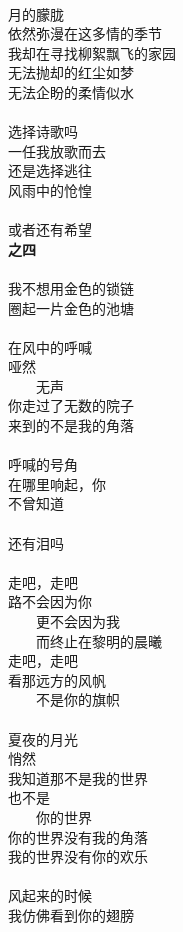 \\
月的朦胧\\
依然弥漫在这多情的季节\\
我却在寻找柳絮飘飞的家园\\
无法抛却的红尘如梦\\
无法企盼的柔情似水\\
\\
选择诗歌吗\\
一任我放歌而去\\
还是选择逃往\\
风雨中的怆惶\\
\\
或者还有希望\\
\newpage\noindent
\textbf{之四}\\
\\
我不想用金色的锁链\\
圈起一片金色的池塘\\
\\
在风中的呼喊\\
哑然\\
　　无声\\
你走过了无数的院子\\
来到的不是我的角落\\
\\
呼喊的号角\\
在哪里响起，你\\
不曾知道\\
\\
还有泪吗\\
\\
走吧，走吧\\
路不会因为你\\
　　更不会因为我\\
　　而终止在黎明的晨曦\\
走吧，走吧\\
看那远方的风帆\\
　　不是你的旗帜\\
\\
夏夜的月光\\
悄然\\
我知道那不是我的世界\\
也不是\\
　　你的世界\\
你的世界没有我的角落\\
我的世界没有你的欢乐\\
\\
风起来的时候\\
我仿佛看到你的翅膀\\
